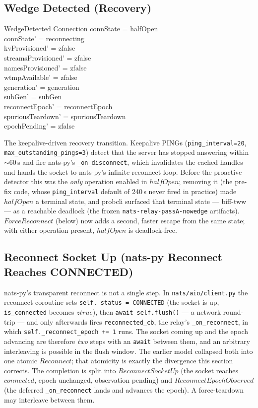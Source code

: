 \documentclass[a4paper,10pt,fleqn]{article}
\begin{document}
\subsection{Wedge Detected (Recovery)}

\begin{schema}{WedgeDetected}
  \Delta Connection
  \where
  connState = halfOpen \\
  connState' = reconnecting \\
  kvProvisioned' = zfalse \\
  streamsProvisioned' = zfalse \\
  namesProvisioned' = zfalse \\
  wtmpAvailable' = zfalse \\
  generation' = generation \\
  subGen' = subGen \\
  reconnectEpoch' = reconnectEpoch \\
  spuriousTeardown' = spuriousTeardown \\
  epochPending' = zfalse
\end{schema}

The keepalive-driven recovery transition.
Keepalive PINGs (\texttt{ping\_interval=20}, \texttt{max\_outstanding\_pings=3})
detect that the server has stopped answering within
$\sim$60\,s and fire nats-py's \texttt{\_on\_disconnect}, which
invalidates the cached handles and hands the socket to nats-py's
infinite reconnect loop.  Before the proactive detector this was
the \emph{only} operation enabled in $halfOpen$; removing it (the
pre-fix code, whose \texttt{ping\_interval} default of 240\,s never
fired in practice) made $halfOpen$ a terminal state, and probcli
surfaced that terminal state --- biff-tww --- as a reachable
deadlock (the frozen \texttt{nats-relay-passA-nowedge} artifacts).
$ForceReconnect$ (below) now adds a second, faster escape from the
same state; with either operation present, $halfOpen$ is
deadlock-free.

\subsection{Reconnect Socket Up (nats-py Reconnect Reaches CONNECTED)}
\label{sec:flushwindow}

nats-py's transparent reconnect is not a single step.  In
\texttt{nats/aio/client.py} the reconnect coroutine sets
\texttt{self.\_status = CONNECTED} (the socket is up,
\texttt{is\_connected} becomes $ztrue$), then \texttt{await
self.flush()} --- a network round-trip --- and only afterwards fires
\texttt{reconnected\_cb}, the relay's \texttt{\_on\_reconnect}, in which
\texttt{self.\_reconnect\_epoch += 1} runs.  The socket coming up and the
epoch advancing are therefore \emph{two} steps with an \texttt{await}
between them, and an arbitrary interleaving is possible in the flush
window.  The earlier model collapsed both into one atomic $Reconnect$;
that atomicity is exactly the divergence this section corrects.  The
completion is split into $ReconnectSocketUp$ (the socket reaches
$connected$, epoch unchanged, observation pending) and
$ReconnectEpochObserved$ (the deferred \texttt{\_on\_reconnect} lands and
advances the epoch).  A force-teardown may interleave between them.
\end{document}

